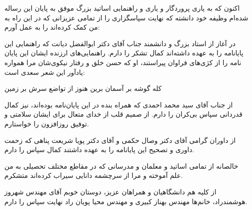 اکنون که به یاری پروردگار و یاری و راهنمایی اساتید بزرگ موفق به پایان این رساله شده‌ام وظیفه خود دانشته که نهایت سپاسگزاری را از تمامی عزیزانی که در این راه به من کمک کرده‌اند را به عمل آورم:

در آغاز از استاد بزرگ و دانشمند جناب آقای دکتر ابوالفضل دیانت که راهنمایی این پایانامه را به عهده داشته‌اند کمال تشکر را دارم. راهنمایی‌های ارزنده ایشان این پایان نامه را از کژی‌های فراوان پیراستند، او که حسن خلق و رفتار نیکوی‌شان مرا همواره یادآور این شعر سعدی است:

                                             کله گوشه بر آسمان برین                     هنوز از تواضع سرش بر زمین

از جناب آقای سید محمد احمدی که همراه بنده در این پایان‌نامه بوده‌اند، نیز کمال قدردانی سپاس بی‌کران  را دارم. از صمیم قلب از خدای متعال برای ایشان سلامتی و توفیق روزافزون را خواستارم.

از داوران گرامی آقای دکتر وصال حکمی و آقای دکتر پویا شریعت پناهی که زحمت داوری و تصحیح این پایانامه را به عهده داشتند کمال سپاس را دارم.

خالصانه از تمامی اساتید و معلمان و مدرسانی که در مقاطع مختلف تحصیلی به من علم آموخته و مرا از سرچشمه دانایی سیراب کرده‌اند متشکرم.

از کلیه هم دانشگاهیان و همراهان عزیز، دوستان خوبم آقای مهندس شهروز هوشمندراد، خانم‌ها مهندس بهناز کبیری و مهندس محیا پویان راد نهایت سپاس را دارم.

